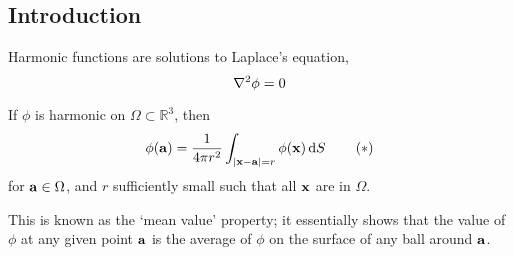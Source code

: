 \subsection{Introduction}
Harmonic functions are solutions to Laplace's equation,
\[ \laplacian{\phi} = 0 \]
\begin{proposition}
	If \(\phi\) is harmonic on \(\Omega \subset \mathbb R^3\), then
	\begin{equation}
		\phi(\vb a) = \frac{1}{4 \pi r^2} \int_{\abs{\vb x - \vb a} = r} \phi(\vb x) \dd{S}\tag{\(\ast\)}
	\end{equation}
	for \(\vb a \in \Omega\), and \(r\) sufficiently small such that all \(\vb x\) are in \(\Omega\).
\end{proposition}
\noindent This is known as the `mean value' property; it essentially shows that the value of \(\phi\) at any given point \(\vb a\) is the average of \(\phi\) on the surface of any ball around \(\vb a\).
